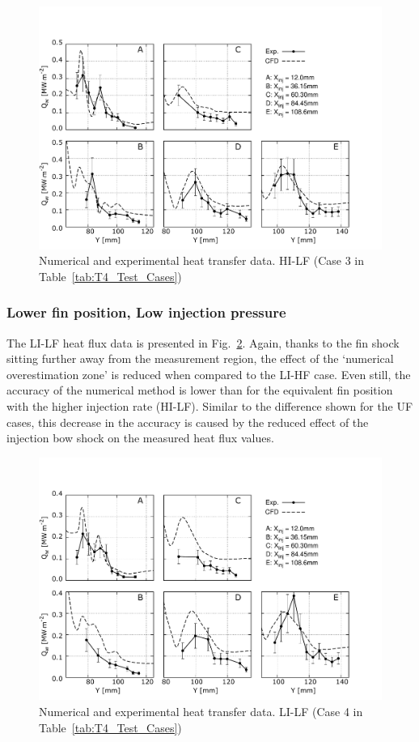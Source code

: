 \documentclass{AIAA}
\begin{document}
%
\begin{figure}[!h]
\center
\includegraphics[trim = 0mm 3mm 25mm 25mm, clip, width=0.60\columnwidth,valign=t,fbox]{Figures/Data/LP_HI_LF/GNUP_CFD_GaugesLines_Multi.pdf}
\caption{Numerical and experimental heat transfer data. HI-LF (Case 3 in Table~\ref{tab:T4_Test_Cases})}
\label{fig:HeatFluxLPHILF}
\end{figure} 


\subsubsection{Lower fin position, Low injection pressure}
 
The LI-LF heat flux data is presented in Fig.~\ref{fig:HeatFluxLPLILF}.
Again, thanks to the fin shock sitting further away from the measurement region, the effect of the `numerical overestimation zone' is reduced when compared to the LI-HF case.
Even still, the accuracy of the numerical method is lower than for the equivalent fin position with the higher injection rate (HI-LF).
Similar to the difference shown for the UF cases, this decrease in the accuracy is caused by the reduced effect of the injection bow shock on the measured heat flux values.

%
\begin{figure}[!h]
\center
\includegraphics[trim = 0mm 3mm 25mm 25mm, clip, width=0.60\columnwidth,valign=t,fbox]{Figures/Data/LP_LI_LF/GNUP_CFD_GaugesLines_Multi.pdf}
\caption{Numerical and experimental heat transfer data. LI-LF (Case 4 in Table~\ref{tab:T4_Test_Cases})}
\label{fig:HeatFluxLPLILF}
\end{figure} 
\end{document}
